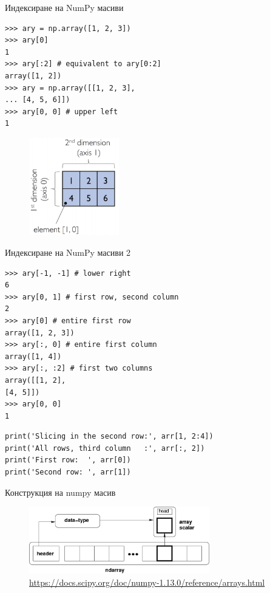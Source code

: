 \documentclass{beamer}
\begin{document}
\begin{frame}[fragile]{Индексиране на NumPy масиви}
\begin{verbatim}
>>> ary = np.array([1, 2, 3])
>>> ary[0]
1
>>> ary[:2] # equivalent to ary[0:2]
array([1, 2])
>>> ary = np.array([[1, 2, 3],
... [4, 5, 6]])
>>> ary[0, 0] # upper left
1
\end{verbatim}
\begin{figure}
    \centering
    \includegraphics[width=0.35\textwidth]{np2.png}
\end{figure}
\end{frame}

\begin{frame}[fragile]{Индексиране на NumPy масиви 2}
\begin{verbatim}
>>> ary[-1, -1] # lower right
6
>>> ary[0, 1] # first row, second column
2
>>> ary[0] # entire first row
array([1, 2, 3])
>>> ary[:, 0] # entire first column
array([1, 4])
>>> ary[:, :2] # first two columns
array([[1, 2],
[4, 5]])
>>> ary[0, 0]
1
\end{verbatim}
\begin{lstlisting}
print('Slicing in the second row:', arr[1, 2:4]) 
print('All rows, third column   :', arr[:, 2])
print('First row:  ', arr[0])
print('Second row: ', arr[1])
\end{lstlisting}


\end{frame}

\begin{frame}{Конструкция на numpy масив}
\begin{figure}
    \centering
    \includegraphics[width=0.7\textwidth]{threefundamental.png}
    \caption{\url{https://docs.scipy.org/doc/numpy-1.13.0/reference/arrays.html}}
    \label{fig:my_label}
\end{figure}{}
\end{frame}
\end{document}
